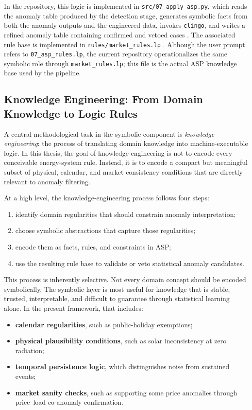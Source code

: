 In the repository, this logic is implemented in \texttt{src/07\_apply\_asp.py}, which reads the anomaly table produced by the detection stage, generates symbolic facts from both the anomaly outputs and the engineered data, invokes \texttt{clingo}, and writes a refined anomaly table containing confirmed and vetoed cases \cite{repo_thesis_grid_anomaly}. The associated rule base is implemented in \texttt{rules/market\_rules.lp} \cite{repo_thesis_grid_anomaly}. Although the user prompt refers to \texttt{07\_asp\_rules.lp}, the current repository operationalizes the same symbolic role through \texttt{market\_rules.lp}; this file is the actual ASP knowledge base used by the pipeline.

\subsection{Knowledge Engineering: From Domain Knowledge to Logic Rules}

A central methodological task in the symbolic component is \emph{knowledge engineering}: the process of translating domain knowledge into machine-executable logic. In this thesis, the goal of knowledge engineering is not to encode every conceivable energy-system rule. Instead, it is to encode a compact but meaningful subset of physical, calendar, and market consistency conditions that are directly relevant to anomaly filtering.

At a high level, the knowledge-engineering process follows four steps:
\begin{enumerate}
	\item identify domain regularities that should constrain anomaly interpretation;
	\item choose symbolic abstractions that capture those regularities;
	\item encode them as facts, rules, and constraints in ASP;
	\item use the resulting rule base to validate or veto statistical anomaly candidates.
\end{enumerate}

This process is inherently selective. Not every domain concept should be encoded symbolically. The symbolic layer is most useful for knowledge that is stable, trusted, interpretable, and difficult to guarantee through statistical learning alone. In the present framework, that includes:
\begin{itemize}
	\item \textbf{calendar regularities}, such as public-holiday exemptions;
	\item \textbf{physical plausibility conditions}, such as solar inconsistency at zero radiation;
	\item \textbf{temporal persistence logic}, which distinguishes noise from sustained events;
	\item \textbf{market sanity checks}, such as supporting some price anomalies through price--load co-anomaly confirmation.
\end{itemize}

